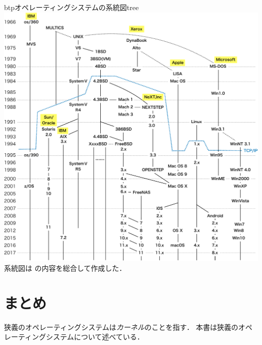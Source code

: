 \begin{myfig}{btp}{オペレーティングシステムの系統図}{tree}
  \includegraphics[scale=0.66]{Fig/tree-crop.pdf}\\
                  {\small
                    系統図は\cite{os360,
                      mvs,
                      os390,
                      zos,
                      unix,
                      solaris,
                      aix,
                      mach,
                      bsd,
                      bsdd,
                      386bsd,
                      freebsd,
                      freenas,
                      nextstep,
                      classicmacos,
                      dynabook,
                      macos,
                      ios,
                      linux,
                      android,
                      msdos,
                      windows}
                    の内容を総合して作成した．}
\end{myfig}

\section{まとめ}
狭義のオペレーティングシステムは\emph{カーネル}のことを指す．
本書は狭義のオペレーティングシステムについて述べている．

